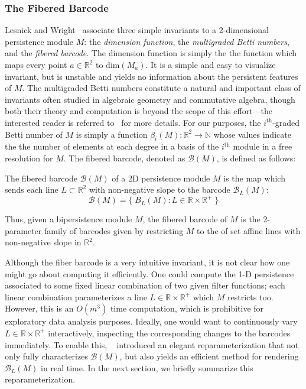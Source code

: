 \documentclass{siamart190516}
\begin{document}
\subsubsection*{The Fibered Barcode}
Lesnick and Wright~\cite{lesnick2015interactive} associate three simple invariants to a 2-dimensional persistence module $M$: the \emph{dimension function}, the \emph{multigraded Betti numbers}, and the \emph{fibered barcode}. 
The dimension function is simply the the function which maps every point $a \in \mathbb{R}^2$ to $\mathrm{dim}(M_a)$. It is a simple and easy to visualize invariant, but is unstable and yields no information about the persistent features of $M$. 
The multigraded Betti numbers constitute a natural and important class of invariants often studied in algebraic geometry and commutative algebra, though both their theory and computation is beyond the scope of this effort---the interested reader is referred to~\cite{lesnick2015interactive, carlsson2009theory} for more details. For our purposes, the $i^{\text{th}}$-graded Betti number of $M$ is simply a function $\beta_i(M): \mathbb{R}^2 \to \mathbb{N}$ whose values indicate the the number of elements at  each degree in a basis of the $i^{\text{th}}$ module in a free resolution for $M$. 
The fibered barcode, denoted as $\mathcal{B}(M)$, is defined as follows: 
\begin{definition}
	The fibered barcode $\mathcal{B}(M)$ of a 2D persistence module $M$ is the map which sends each line  $L \subset \mathbb{R}^2$ with non-negative slope to the barcode $\mathcal{B}_L(M)$: 
$$ \mathcal{B}(M) = \{ \; B_L(M) : L \in \mathbb{R} \times \mathbb{R}^{+} \; \}$$
\end{definition} 
\noindent Thus, given a bipersistence module $M$, the fibered barcode of $M$ is the 2-parameter family of barcodes given by restricting $M$ to the of set affine lines with non-negative slope in $\mathbb{R}^2$. 

Although the fiber barcode is a very intuitive invariant, it is not clear how one might go about computing it efficiently. 
One could compute the 1-D persistence associated to some fixed linear combination of two given filter functions; each linear combination parameterizes a line $L \in \mathbb{R} \times \mathbb{R}^{+}$ which $M$ restricts too. 
However, this is an $O(m^3)$ time computation, which is prohibitive for exploratory data analysis purposes. 
Ideally, one would want to continuously vary $L \in \mathbb{R} \times \mathbb{R}^{+}$ interactively, inspecting the corresponding changes to the barcodes immediately. To enable this, ~\cite{lesnick2015interactive} introduced an elegant reparameterization that not only fully characterizes $\mathcal{B}(M)$, but also yields an efficient method for rendering $\mathcal{B}_L(M)$ in real time. In the next section, we briefly summarize this reparameterization. 
\end{document}
